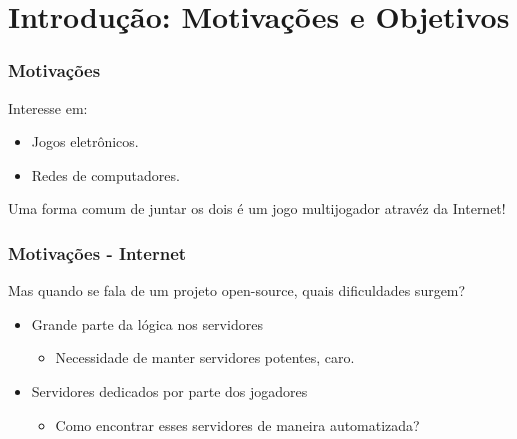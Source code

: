 \documentclass[brazil]{beamer}
\begin{document}
\section{Introdução: Motivações e Objetivos}
\begin{frame}[fragile]
  \frametitle{Motivações}
  Interesse em:
  \begin{itemize}
    \item Jogos eletrônicos.
    \item Redes de computadores.
  \end{itemize}
  \pause
  \vspace{30pt}
  Uma forma comum de juntar os dois é um jogo multijogador atravéz da Internet!
\end{frame}
\begin{frame}[fragile]
  \frametitle{Motivações - Internet}
  Mas quando se fala de um projeto open-source, quais dificuldades surgem?
  \pause
  \vspace{10pt}
  \begin{itemize}
    \item Grande parte da lógica nos servidores
        \pause
        \begin{itemize} \item Necessidade de manter servidores potentes, caro. \end{itemize}
    \pause
    \vspace{10pt}
    \item Servidores dedicados por parte dos jogadores
        \pause
        \begin{itemize} \item Como encontrar esses servidores de maneira automatizada? \end{itemize}
  \end{itemize}

\end{frame}
\end{document}
